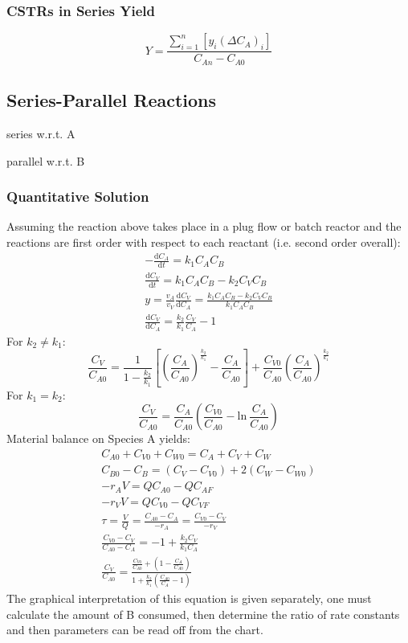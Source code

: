 \documentclass[10pt, oneside, twocolumn]{article}
\numberwithin{equation}{section}
\begin{document}
			\subsubsection{CSTRs in Series Yield}
				\begin{equation}
				Y=\frac{\sum_{i=1}^{n}\left[y_i{\left(\Delta C_A\right)}_i\right]}{C_{An}-C_{A0}}
				\end{equation}
		\subsection{Series-Parallel Reactions}
			 series w.r.t. A \par
			 parallel w.r.t. B \par
			\subsubsection{Quantitative Solution}
				Assuming the reaction above takes place in a plug flow or batch reactor and the reactions are first order with respect to each reactant (i.e. second order overall):
				\begin{gather}
				-\frac{\mathrm{d}C_A}{\mathrm{d}t}=k_1C_AC_B\\
				\frac{\mathrm{d}C_V}{\mathrm{d}t}=k_1C_AC_B-k_2C_VC_B\\
				y=\frac{v_A}{v_V}\frac{\mathrm{d}C_V}{\mathrm{d}C_A}=\frac{k_1C_AC_B-k_2C_VC_B}{k_1C_AC_B}\\
				\frac{\mathrm{d}C_V}{\mathrm{d}C_A}=\frac{k_2}{k_1}\frac{C_V}{C_A}-1
				\end{gather}
				For $k_2 \ne k_1$:
				\begin{equation}
				\frac{C_V}{C_{A0}}=\frac{1}{1-\frac{k_2}{k_1}}\left[{\left(\frac{C_A}{C_{A0}}\right)}^{\frac{k_2}{k_1}}-\frac{C_A}{C_{A0}}\right]+\frac{C_{V0}}{C_{A0}}{\left(\frac{C_A}{C_{A0}}\right)}^{\frac{k_2}{k_1}}
				\end{equation}
				For $k_1=k_2$:
				\begin{equation}
				\frac{C_V}{C_{A0}}=\frac{C_A}{C_{A0}}\left(\frac{C_{V0}}{C_{A0}}-\mathrm{ln} \ \frac{C_A}{C_{A0}}\right)
				\end{equation}
				Material balance on Species A yields:
				\begin{gather}
				C_{A0}+C_{V0}+C_{W0}=C_A+C_V+C_W\\
				C_{B0}-C_B=\left(C_V-C_{V0}\right)+2\left(C_W-C_{W0}\right)\\
				-r_AV=QC_{A0}-QC_{AF}\\
				-r_VV=QC_{V0}-QC_{VF}\\
				\tau=\frac{V}{Q}=\frac{C_{A0}-C_A}{-r_A}=\frac{C_{V0}-C_V}{-r_V}\\
				\frac{C_{V0}-C_V}{C_{A0}-C_A}=-1+\frac{k_2C_V}{k_1C_A}\\
				\frac{C_V}{C_{A0}}=\frac{\frac{C_{V0}}{C_{A0}}+\left(1-\frac{C_A}{C_{A0}}\right)}{1+\frac{k_2}{k_1}\left(\frac{C_{A0}}{C_A}-1\right)}
				\end{gather}
				The graphical interpretation of this equation is given separately, one must calculate the amount of B consumed, then determine the ratio of rate constants and then parameters can be read off from the chart.
\end{document}
